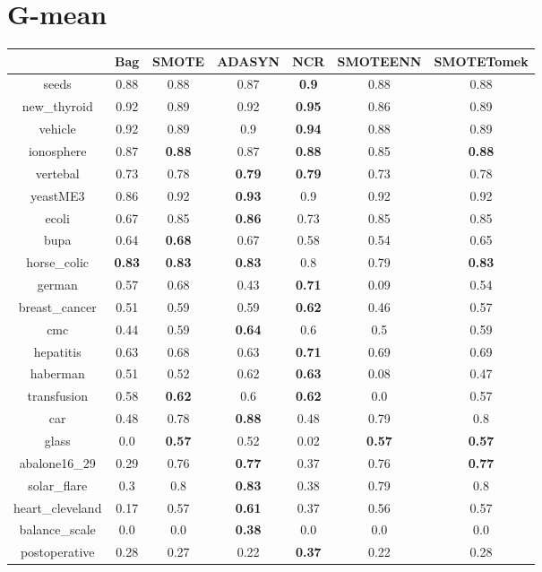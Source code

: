 \documentclass{article}%
\begin{document}
\section*{G{-}mean}%
\begin{tabular}{c|cccccc}%
&Bag&SMOTE&ADASYN&NCR&SMOTEENN&SMOTETomek\\%
\hline%
seeds&0.88&0.88&0.87&\textbf{0.9}&0.88&0.88\\%
new\_thyroid&0.92&0.89&0.92&\textbf{0.95}&0.86&0.89\\%
vehicle&0.92&0.89&0.9&\textbf{0.94}&0.88&0.89\\%
ionosphere&0.87&\textbf{0.88}&0.87&\textbf{0.88}&0.85&\textbf{0.88}\\%
vertebal&0.73&0.78&\textbf{0.79}&\textbf{0.79}&0.73&0.78\\%
yeastME3&0.86&0.92&\textbf{0.93}&0.9&0.92&0.92\\%
ecoli&0.67&0.85&\textbf{0.86}&0.73&0.85&0.85\\%
bupa&0.64&\textbf{0.68}&0.67&0.58&0.54&0.65\\%
horse\_colic&\textbf{0.83}&\textbf{0.83}&\textbf{0.83}&0.8&0.79&\textbf{0.83}\\%
german&0.57&0.68&0.43&\textbf{0.71}&0.09&0.54\\%
breast\_cancer&0.51&0.59&0.59&\textbf{0.62}&0.46&0.57\\%
cmc&0.44&0.59&\textbf{0.64}&0.6&0.5&0.59\\%
hepatitis&0.63&0.68&0.63&\textbf{0.71}&0.69&0.69\\%
haberman&0.51&0.52&0.62&\textbf{0.63}&0.08&0.47\\%
transfusion&0.58&\textbf{0.62}&0.6&\textbf{0.62}&0.0&0.57\\%
car&0.48&0.78&\textbf{0.88}&0.48&0.79&0.8\\%
glass&0.0&\textbf{0.57}&0.52&0.02&\textbf{0.57}&\textbf{0.57}\\%
abalone16\_29&0.29&0.76&\textbf{0.77}&0.37&0.76&\textbf{0.77}\\%
solar\_flare&0.3&0.8&\textbf{0.83}&0.38&0.79&0.8\\%
heart\_cleveland&0.17&0.57&\textbf{0.61}&0.37&0.56&0.57\\%
balance\_scale&0.0&0.0&\textbf{0.38}&0.0&0.0&0.0\\%
postoperative&0.28&0.27&0.22&\textbf{0.37}&0.22&0.28\\%
\end{tabular}

%
\end{document}
